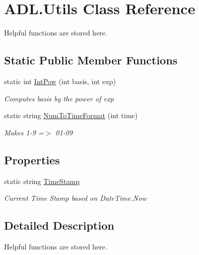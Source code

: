 \hypertarget{class_a_d_l_1_1_utils}{}\section{A\+D\+L.\+Utils Class Reference}
\label{class_a_d_l_1_1_utils}


Helpful functions are stored here.  


\subsection*{Static Public Member Functions}
\begin{DoxyCompactItemize}
\item 
static int \mbox{\hyperlink{class_a_d_l_1_1_utils_ac921cfeea8d73d9ac4298802e2594504}{Int\+Pow}} (int basis, int exp)
\begin{DoxyCompactList}\small\item\em Computes basis by the power of exp \end{DoxyCompactList}\item 
static string \mbox{\hyperlink{class_a_d_l_1_1_utils_a7f8a756ce7c6c8d4cfe7126ef534e151}{Num\+To\+Time\+Format}} (int time)
\begin{DoxyCompactList}\small\item\em Makes 1-\/9 =$>$ 01-\/09 \end{DoxyCompactList}\end{DoxyCompactItemize}
\subsection*{Properties}
\begin{DoxyCompactItemize}
\item 
static string \mbox{\hyperlink{class_a_d_l_1_1_utils_a93a1013d16031cf968a4383b56f4b24f}{Time\+Stamp}}
\begin{DoxyCompactList}\small\item\em Current Time Stamp based on Date\+Time.\+Now \end{DoxyCompactList}\end{DoxyCompactItemize}


\subsection{Detailed Description}
Helpful functions are stored here. 




